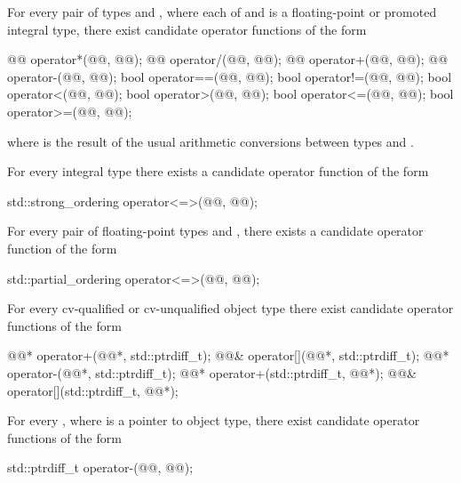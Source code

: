 \pnum
For every pair of types  and ,
where each of  and  is a
floating-point or promoted integral type,
there exist candidate operator functions of the form
\begin{codeblock}
@@      operator*(@@, @@);
@@      operator/(@@, @@);
@@      operator+(@@, @@);
@@      operator-(@@, @@);
bool    operator==(@@, @@);
bool    operator!=(@@, @@);
bool    operator<(@@, @@);
bool    operator>(@@, @@);
bool    operator<=(@@, @@);
bool    operator>=(@@, @@);
\end{codeblock}
where
is the result of the usual arithmetic conversions between types
and
.

\pnum
For every integral type 
there exists a candidate operator function of the form
\begin{codeblock}
std::strong_ordering operator<=>(@@, @@);
\end{codeblock}

\pnum
For every pair of floating-point types
 and ,
there exists a candidate operator function of the form
\begin{codeblock}
std::partial_ordering operator<=>(@@, @@);
\end{codeblock}

\pnum
For every cv-qualified or cv-unqualified object type
there exist candidate operator functions of the form
\begin{codeblock}
@@*      operator+(@@*, std::ptrdiff_t);
@@&      operator[](@@*, std::ptrdiff_t);
@@*      operator-(@@*, std::ptrdiff_t);
@@*      operator+(std::ptrdiff_t, @@*);
@@&      operator[](std::ptrdiff_t, @@*);
\end{codeblock}

\pnum
For every
,
where
is a pointer to object type,
there exist candidate operator functions of the form
\begin{codeblock}
std::ptrdiff_t   operator-(@@, @@);
\end{codeblock}

